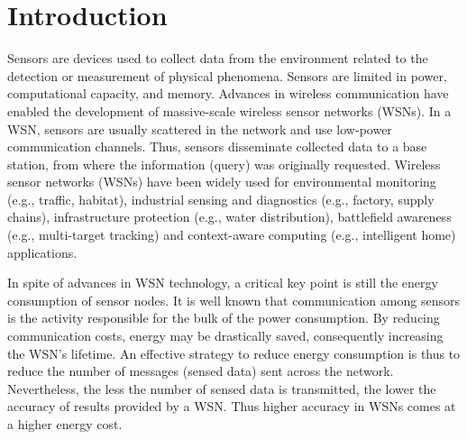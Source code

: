 \documentclass{acm_proc_article-sp}
\begin{document}





%



\section{Introduction}


Sensors are devices used to collect data from the environment related to the
detection or measurement of physical phenomena. Sensors are limited in power,
computational capacity, and memory. Advances in wireless communication have
enabled the development of massive-scale wireless sensor networks (WSNs). In a
WSN, sensors are usually scattered in the network and use low-power
communication channels. Thus, sensors disseminate collected data to a base
station, from where the information (query) was originally requested. Wireless
sensor networks (WSNs) have been widely used for environmental monitoring (e.g.,
traffic, habitat), industrial sensing and diagnostics (e.g., factory, supply
chains), infrastructure protection (e.g., water distribution), battlefield
awareness (e.g., multi-target tracking) and context-aware computing (e.g.,
intelligent home) applications.

In spite of advances in WSN technology, a critical key point is still the
energy consumption of sensor nodes. It is well known that communication among
sensors is the activity responsible for the bulk of the power consumption. By
reducing communication costs, energy may be drastically saved, consequently
increasing the WSN's lifetime. An effective strategy to reduce energy
consumption is thus to reduce the number of messages (sensed data) sent across
the network. Nevertheless, the less the number of sensed data is transmitted,
the lower the accuracy of results provided by a WSN. Thus higher accuracy in
WSNs comes at a higher energy cost.
\end{document}
